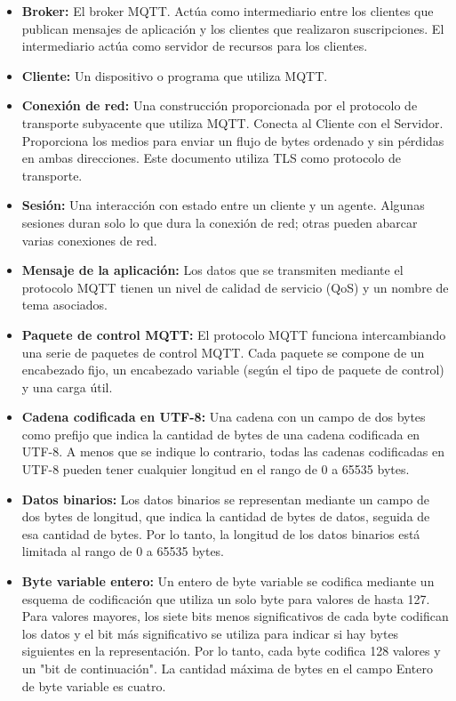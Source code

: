 \begin{itemize}
    \item \textbf{Broker: }El broker MQTT. Actúa como intermediario entre los clientes que publican mensajes de aplicación y los clientes que realizaron suscripciones. El intermediario actúa como servidor de recursos para los clientes.
    \item \textbf{Cliente: }Un dispositivo o programa que utiliza MQTT.
    \item \textbf{Conexión de red: }Una construcción proporcionada por el protocolo de transporte subyacente que utiliza MQTT. Conecta al Cliente con el Servidor. Proporciona los medios para enviar un flujo de bytes ordenado y sin pérdidas en ambas direcciones. Este documento utiliza TLS como protocolo de transporte.
    \item \textbf{Sesión: }Una interacción con estado entre un cliente y un agente. Algunas sesiones duran solo lo que dura la conexión de red; otras pueden abarcar varias conexiones de red.
    \item \textbf{Mensaje de la aplicación: }Los datos que se transmiten mediante el protocolo MQTT tienen un nivel de calidad de servicio (QoS) y un nombre de tema asociados.
    \item \textbf{Paquete de control MQTT: }El protocolo MQTT funciona intercambiando una serie de paquetes de control MQTT. Cada paquete se compone de un encabezado fijo, un encabezado variable (según el tipo de paquete de control) y una carga útil.
    \item \textbf{Cadena codificada en UTF-8: }Una cadena con un campo de dos bytes como prefijo que indica la cantidad de bytes de una cadena codificada en UTF-8. A menos que se indique lo contrario, todas las cadenas codificadas en UTF-8 pueden tener cualquier longitud en el rango de 0 a 65535 bytes.
    \item \textbf{Datos binarios: }Los datos binarios se representan mediante un campo de dos bytes de longitud, que indica la cantidad de bytes de datos, seguida de esa cantidad de bytes. Por lo tanto, la longitud de los datos binarios está limitada al rango de 0 a 65535 bytes.
    \item \textbf{Byte variable entero: }Un entero de byte variable se codifica mediante un esquema de codificación que utiliza un solo byte para valores de hasta 127. Para valores mayores, los siete bits menos significativos de cada byte codifican los datos y el bit más significativo se utiliza para indicar si hay bytes siguientes en la representación. Por lo tanto, cada byte codifica 128 valores y un "bit de continuación". La cantidad máxima de bytes en el campo Entero de byte variable es cuatro.

\end{itemize}

